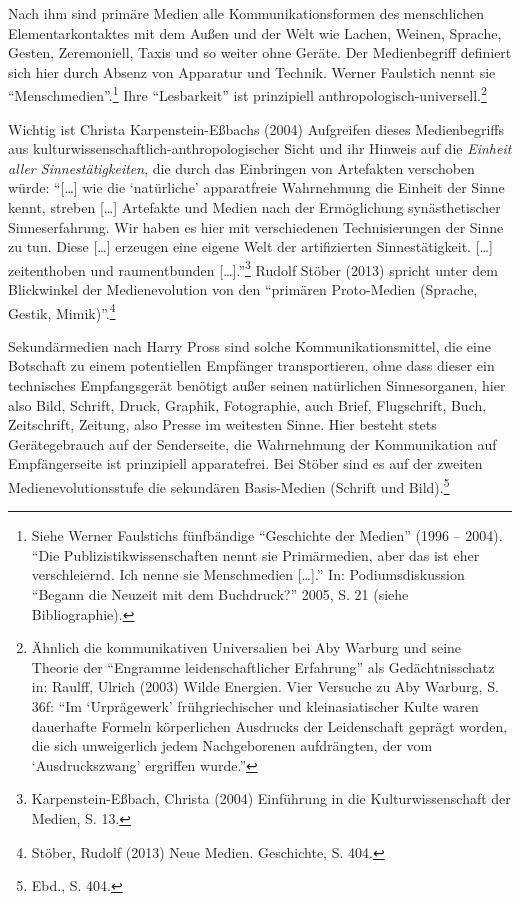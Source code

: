 \documentclass[a4paper,
fontsize=11pt,
oneside,
numbers=noperiodatend,
parskip=half-,
bibliography=totoc,
final
]{scrartcl}
\begin{document}
Nach ihm sind primäre Medien alle Kommunikationsformen des menschlichen
Elementarkontaktes mit dem Außen und der Welt wie Lachen, Weinen,
Sprache, Gesten, Zeremoniell, Taxis und so weiter ohne Geräte. Der
Medienbegriff definiert sich hier durch Absenz von Apparatur und
Technik. Werner Faulstich nennt sie \enquote{Menschmedien}.\footnote{Siehe
  Werner Faulstichs fünfbändige \enquote{Geschichte der Medien} (1996 --
  2004). \enquote{Die Publizistikwissenschaften nennt sie Primärmedien,
  aber das ist eher verschleiernd. Ich nenne sie Menschmedien
  {[}\ldots{}{]}.} In: Podiumsdiskussion \enquote{Begann die Neuzeit mit
  dem Buchdruck?} 2005, S. 21 (siehe Bibliographie).} Ihre
\enquote{Lesbarkeit} ist prinzipiell
anthropologisch-universell.\footnote{Ähnlich die kommunikativen
  Universalien bei Aby Warburg und seine Theorie der \enquote{Engramme
  leidenschaftlicher Erfahrung} als Gedächtnisschatz in: Raulff, Ulrich
  (2003) Wilde Energien. Vier Versuche zu Aby Warburg, S. 36f:
  \enquote{Im \enquote{Urprägewerk} frühgriechischer und
  kleinasiatischer Kulte waren dauerhafte Formeln körperlichen Ausdrucks
  der Leidenschaft geprägt worden, die sich unweigerlich jedem
  Nachgeborenen aufdrängten, der vom \enquote{Ausdruckszwang} ergriffen
  wurde.}}

Wichtig ist Christa Karpenstein-Eßbachs (2004) Aufgreifen dieses
Medienbegriffs aus kultur\-wissen\-schaftlich-anthropologischer Sicht und
ihr Hinweis auf die \emph{Einheit aller Sinnestätigkeiten}, die durch
das Einbringen von Artefakten verschoben würde: \enquote{{[}\ldots{}{]}
wie die \enquote{natürliche} apparatfreie Wahrnehmung die Einheit der
Sinne kennt, streben {[}\ldots{}{]} Artefakte und Medien nach der
Ermöglichung synästhetischer Sinneserfahrung. Wir haben es hier mit
verschiedenen Technisierungen der Sinne zu tun. Diese {[}\ldots{}{]}
erzeugen eine eigene Welt der artifizierten Sinnestätigkeit.
{[}\ldots{}{]} zeitenthoben und raumentbunden {[}\ldots{}{]}.}\footnote{Karpenstein-Eßbach,
  Christa (2004) Einführung in die Kulturwissenschaft der Medien, S. 13.}
Rudolf Stöber (2013) spricht unter dem Blickwinkel der Medienevolution
von den \enquote{primären Proto-Medien (Sprache, Gestik,
Mimik)}.\footnote{Stöber, Rudolf (2013) Neue Medien. Geschichte, S. 404.}

Sekundärmedien nach Harry Pross sind solche Kommunikationsmittel, die
eine Botschaft zu einem potentiellen Empfänger transportieren, ohne dass
dieser ein technisches Empfangsgerät benötigt außer seinen natürlichen
Sinnesorganen, hier also Bild, Schrift, Druck, Graphik, Fotographie,
auch Brief, Flugschrift, Buch, Zeitschrift, Zeitung, also Presse im
weitesten Sinne. Hier besteht stets Gerätegebrauch auf der Senderseite,
die Wahrnehmung der Kommunikation auf Empfängerseite ist prinzipiell
apparatefrei. Bei Stöber sind es auf der zweiten Medienevolutionsstufe
die sekundären Basis-Medien (Schrift und Bild).\footnote{Ebd., S. 404.}
\end{document}
